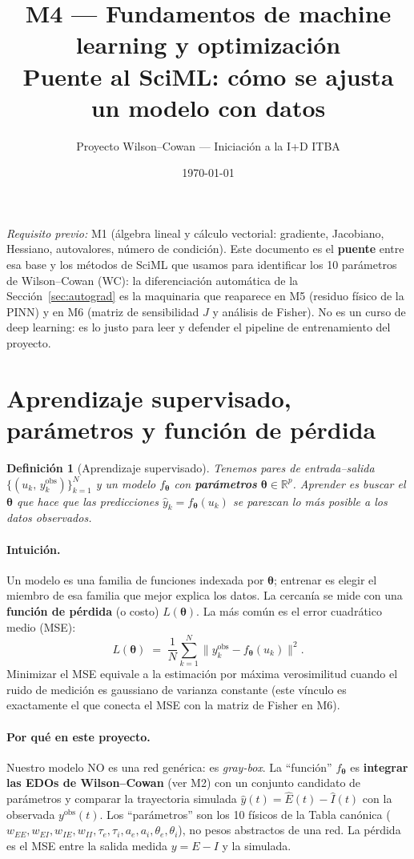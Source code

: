 \documentclass[11pt,a4paper]{article}
\title{\textbf{M4 --- Fundamentos de machine learning y optimización}\\[2pt]\large Puente al SciML: cómo se ajusta un modelo con datos}
\author{Proyecto Wilson--Cowan --- Iniciación a la I+D ITBA}
\date{\today}
\newtheorem{definition}{Definición}
\newcommand{\R}{\mathbb{R}}
\newcommand{\thetavec}{\bm{\theta}}
\begin{document}
\maketitle
\tableofcontents
\bigskip

\noindent\textit{Requisito previo:} M1 (álgebra lineal y cálculo vectorial: gradiente, Jacobiano, Hessiano, autovalores, número de condición). Este documento es el \textbf{puente} entre esa base y los métodos de SciML que usamos para identificar los 10 parámetros de Wilson--Cowan (WC): la diferenciación automática de la Sección~\ref{sec:autograd} es la maquinaria que reaparece en M5 (residuo físico de la PINN) y en M6 (matriz de sensibilidad $J$ y análisis de Fisher). No es un curso de deep learning: es lo justo para leer y defender el pipeline de entrenamiento del proyecto.

\section{Aprendizaje supervisado, parámetros y función de pérdida}

\begin{definition}[Aprendizaje supervisado]
Tenemos pares de entrada--salida $\{(u_k,\,y_k^{\text{obs}})\}_{k=1}^{N}$ y un modelo $f_{\thetavec}$ con \textbf{parámetros} $\thetavec\in\R^{p}$. Aprender es buscar el $\thetavec$ que hace que las predicciones $\hat y_k = f_{\thetavec}(u_k)$ se parezcan lo más posible a los datos observados.
\end{definition}

\paragraph{Intuición.} Un modelo es una familia de funciones indexada por $\thetavec$; entrenar es elegir el miembro de esa familia que mejor explica los datos. La cercanía se mide con una \textbf{función de pérdida} (o costo) $L(\thetavec)$. La más común es el error cuadrático medio (MSE):
$$
L(\thetavec) \;=\; \frac{1}{N}\sum_{k=1}^{N}\big\lVert y_k^{\text{obs}} - f_{\thetavec}(u_k)\big\rVert^2 .
$$
Minimizar el MSE equivale a la estimación por máxima verosimilitud cuando el ruido de medición es gaussiano de varianza constante (este vínculo es exactamente el que conecta el MSE con la matriz de Fisher en M6).

\paragraph{Por qué en este proyecto.} Nuestro modelo NO es una red genérica: es \emph{gray-box}. La ``función'' $f_{\thetavec}$ es \textbf{integrar las EDOs de Wilson--Cowan} (ver M2) con un conjunto candidato de parámetros y comparar la trayectoria simulada $\hat y(t)=\hat E(t)-\hat I(t)$ con la observada $y^{\text{obs}}(t)$. Los ``parámetros'' son los 10 físicos de la Tabla canónica ($w_{EE},w_{EI},w_{IE},w_{II},\tau_e,\tau_i,a_e,a_i,\theta_e,\theta_i$), no pesos abstractos de una red. La pérdida es el MSE entre la salida medida $y=E-I$ y la simulada.
\end{document}

